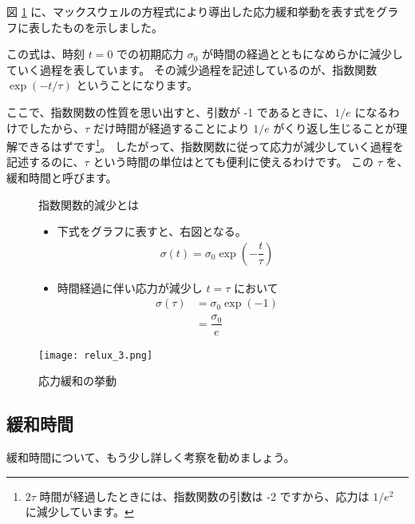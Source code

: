 \documentclass[uplatex,dvipdfmx,a4paper,11pt]{jsreport}
\begin{document}
図 \ref{fig:stress_relux3} に、マックスウェルの方程式により導出した応力緩和挙動を表す式をグラフに表したものを示しました。

この式は、時刻 $t=0$ での初期応力 $\sigma_0$ が時間の経過とともになめらかに減少していく過程を表しています。
その減少過程を記述しているのが、指数関数 $\exp\left(-t/\tau \right)$ ということになります。

ここで、指数関数の性質を思い出すと、引数が -1 であるときに、$1/e$ になるわけでしたから、$\tau$ だけ時間が経過することにより 
$1/e$ がくり返し生じることが理解できるはずです\footnote{
	$2\tau$ 時間が経過したときには、指数関数の引数は -2 ですから、応力は $1/e^2$ に減少しています。
}。
したがって、指数関数に従って応力が減少していく過程を記述するのに、$\tau$ という時間の単位はとても便利に使えるわけです。
この $\tau$ を、緩和時間と呼びます。

\begin{figure}[htb]
	\begin{center}
		\begin{minipage}{0.45\textwidth}
			\begin{itembox}[l]{指数関数的減少とは}
				\begin{itemize}
					\item 下式をグラフに表すと、右図となる。
					\begin{align*}
						\sigma(t) = \sigma_0 \exp \left(-\dfrac{t}{\tau} \right)
					\end{align*}
					\item 時間経過に伴い応力が減少し $t = \tau$ において
					\begin{align*}
						\sigma(\tau) 
						&= \sigma_0 \exp(-1)\\ 
						&= \dfrac{\sigma_0}{e}
					\end{align*}
				\end{itemize}
			\end{itembox}
		\end{minipage}
		\begin{minipage}{0.48\textwidth}
			\begin{center}
			\texttt{[image: relux\_3.png]}
			\end{center}
		\end{minipage}
		\caption{応力緩和の挙動}
		\label{fig:stress_relux3}
	\end{center}
\end{figure}

\subsection{緩和時間}
緩和時間について、もう少し詳しく考察を勧めましょう。
\end{document}
